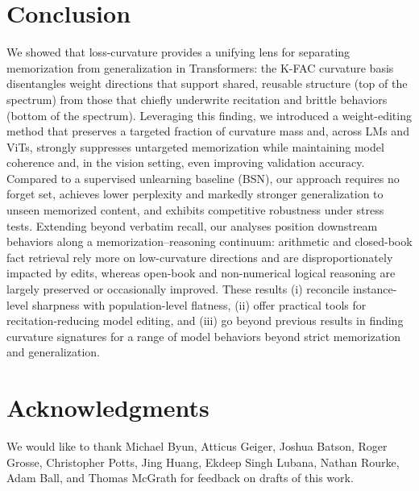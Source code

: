 \documentclass{article} %
\begin{document}
\section{Conclusion}
We showed that loss-curvature provides a unifying lens for separating memorization from generalization in Transformers: the K-FAC curvature basis disentangles weight directions that support shared, reusable structure (top of the spectrum) from those that chiefly underwrite recitation and brittle behaviors (bottom of the spectrum). Leveraging this finding, we introduced a weight-editing method that preserves a targeted fraction of curvature mass and, across LMs and ViTs, strongly suppresses untargeted memorization while maintaining model coherence and, in the vision setting, even improving validation accuracy. Compared to a supervised unlearning baseline (BSN), our approach requires no forget set, achieves lower perplexity and markedly stronger generalization to unseen memorized content, and exhibits competitive robustness under stress tests. Extending beyond verbatim recall, our analyses position downstream behaviors along a memorization–reasoning continuum: arithmetic and closed-book fact retrieval rely more on low-curvature directions and are disproportionately impacted by edits, whereas open-book and non-numerical logical reasoning are largely preserved or occasionally improved. These results (i) reconcile instance-level sharpness with population-level flatness, (ii) offer practical tools for recitation-reducing model editing, and (iii) go beyond previous results in finding curvature signatures for a range of model behaviors beyond strict memorization and generalization. 

\section{Acknowledgments}
We would like to thank Michael Byun, Atticus Geiger, Joshua Batson, Roger Grosse, Christopher Potts, Jing Huang, Ekdeep Singh Lubana, Nathan Rourke, Adam Ball, and Thomas McGrath  for feedback on drafts of this work.




\appendix
\end{document}
